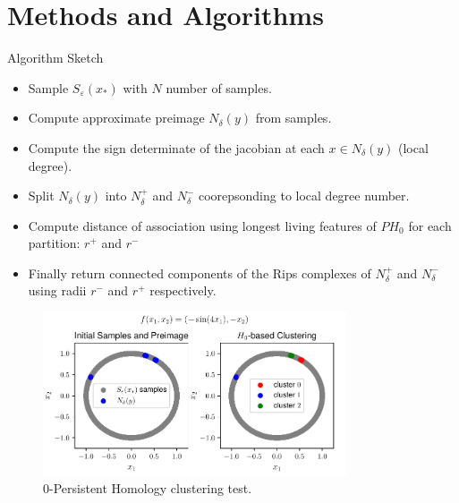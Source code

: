 \documentclass[12pt]{article}
\begin{document}
\section{Methods and Algorithms}
Algorithm Sketch
\begin{itemize}
	\item Sample $S_{\varepsilon}(x_*)$ with $N$ number of samples.
	\item Compute approximate preimage $N_{\delta}(y)$ from samples.
	\item Compute the sign determinate of the jacobian at each $x \in N_{\delta}(y)$ (local degree).
	\item Split $N_{\delta}(y)$ into $N_{\delta}^+$ and $N_{\delta}^-$ coorepsonding to local degree number.
	\item Compute distance of association using longest living features of $P H_0$ for each partition: $r^+$ and $r^-$
	\item Finally return connected components of the Rips complexes of $N_{\delta}^+$ and $N_{\delta}^-$ using radii $r^-$ and $r^+$ respectively.
\end{itemize}
\begin{figure}[h]
\centering
\includegraphics[width=0.8\textwidth]{figs/clustering.pdf}
\caption{$0$-Persistent Homology clustering test.}
\end{figure}
\end{document}
